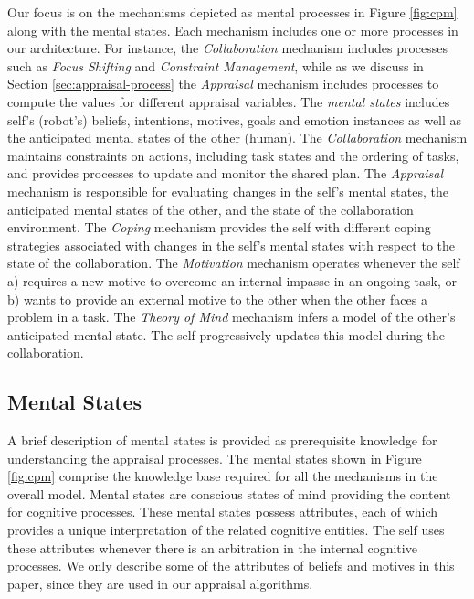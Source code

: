 \documentclass{article}
\begin{document}
Our focus is on the mechanisms depicted as mental processes in Figure
\ref{fig:cpm} along with the mental states. Each mechanism includes one or
more processes in our architecture. For instance, the \textit{Collaboration}
mechanism includes processes such as \textit{Focus Shifting} and
\textit{Constraint Management}, while as we discuss in Section
\ref{sec:appraisal-process} the \textit{Appraisal} mechanism includes processes
to compute the values for different appraisal variables. The \textit{mental
states} includes self's (robot's) beliefs, intentions, motives, goals and
emotion instances as well as the anticipated mental states of the other (human).
The \textit{Collaboration} mechanism maintains constraints on actions, including
task states and the ordering of tasks, and provides processes to update and
monitor the shared plan. The \textit{Appraisal} mechanism is responsible for
evaluating changes in the self's mental states, the anticipated mental states of
the other, and the state of the collaboration environment. The \textit{Coping}
mechanism provides the self with different coping strategies associated with
changes in the self's mental states with respect to the state of the
collaboration. The \textit{Motivation} mechanism operates whenever the self a)
requires a new motive to overcome an internal impasse in an ongoing task, or b)
wants to provide an external motive to the other when the other faces a problem
in a task. The \textit{Theory of Mind} mechanism infers a model of the other's
anticipated mental state. The self progressively updates this model during the
collaboration.

\vspace*{-3mm}
\subsection{Mental States}
\label{sec:mental-states}
\vspace*{-2mm}
A brief description of mental states is provided as prerequisite knowledge for
understanding the appraisal processes. The mental states shown in Figure
\ref{fig:cpm} comprise the knowledge base required for all the mechanisms in the
overall model. Mental states are conscious states of mind providing the content
for cognitive processes. These mental states possess attributes, each of which
provides a unique interpretation of the related cognitive entities. The self
uses these attributes whenever there is an arbitration in the internal cognitive
processes. We only describe some of the attributes of beliefs and motives in
this paper, since they are used in our appraisal algorithms.
\end{document}
